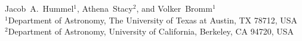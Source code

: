 Jacob~A.~Hummel$^{1}$, Athena~Stacy$^{2}$, and Volker~Bromm$^{1}$\\
$^1$Department of Astronomy, The University of Texas at Austin, TX 78712, USA\\
$^2$Department of Astronomy, University of California, Berkeley, CA 94720, USA